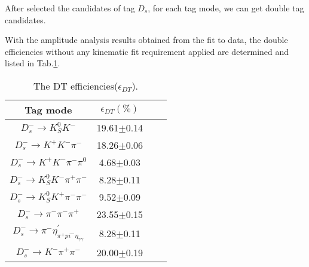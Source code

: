 After selected the candidates of tag $D_{s}$, for each tag mode, we can get double tag candidates. %


With the amplitude analysis results obtained from the fit to data, the double efficiencies without any kinematic fit requirement applied are determined and listed in Tab.\ref{DT-eff}.

    \begin{table}
        \caption{ The DT efficiencies($\epsilon_{DT}$).}
        \label{DT-eff}
        \begin{center}
            \begin{tabular}{cccc}
                \toprule\toprule
                Tag mode   & $\epsilon_{DT}(\%)$\\
                \hline
                $D_{s}^{-} \rightarrow K_{S}^{0}K^{-}$                                                   & 19.61$\pm$0.14\\
                $D_{s}^{-} \rightarrow K^{+}K^{-}\pi^{-}$                                                & 18.26$\pm$0.06\\
                $D_{s}^{-} \rightarrow K^{+}K^{-}\pi^{-}\pi^{0}$                                         &  4.68$\pm$0.03\\
                $D_{s}^{-} \rightarrow K_{S}^{0}K^{-}\pi^{+}\pi^{-}$                                     &  8.28$\pm$0.11\\
                $D_{s}^{-} \rightarrow K_{S}^{0}K^{+}\pi^{-}\pi^{-}$                                     &  9.52$\pm$0.09\\
                $D_{s}^{-} \rightarrow \pi^{-}\pi^{-}\pi^{+}$                                            & 23.55$\pm$0.15\\
                $D_{s}^{-} \rightarrow \pi^{-}\eta_{\pi^{+}pi^{-}\eta_{\gamma\gamma}}^{'}$               &  8.28$\pm$0.11\\
                $D_{s}^{-} \rightarrow K^{-}\pi^{+}\pi^{-}$                                              & 20.00$\pm$0.19\\
                \bottomrule\bottomrule
            \end{tabular}
        \end{center}
    \end{table}


